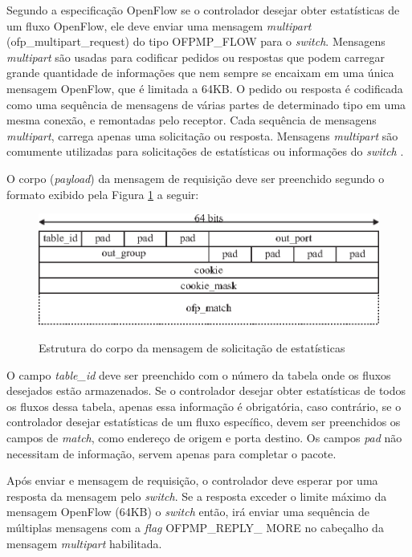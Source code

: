 Segundo a especificação OpenFlow \cite{OpenFlowSpec:2014} se o controlador desejar obter estatísticas de um fluxo OpenFlow, ele deve enviar uma mensagem \textit{multipart} (ofp\_multipart\_request) do tipo OFPMP\_FLOW para o \textit{switch}. Mensagens \textit{multipart} são usadas para codificar pedidos ou respostas que podem carregar grande quantidade de informações que nem sempre se encaixam em uma única mensagem OpenFlow, que é limitada a 64KB. O pedido ou resposta é codificada como uma sequência de mensagens de várias partes de determinado tipo em uma mesma conexão, e remontadas pelo receptor. Cada sequência de mensagens \textit{multipart}, carrega apenas uma solicitação ou resposta. Mensagens \textit{multipart} são comumente utilizadas para solicitações de estatísticas ou informações do \textit{switch} \cite{OpenFlowSpec:2014}.

O corpo (\textit{payload}) da mensagem de requisição deve ser preenchido segundo o formato exibido pela Figura \ref{fig:ofp-multipart-request} a seguir:

\begin{figure}[H]
  \centering
  \caption{Estrutura do corpo da mensagem de solicitação de estatísticas}
  \includegraphics[width=.80\textwidth]{images/ofp-flow-stats-request.eps}
  \label{fig:ofp-multipart-request}
\end{figure}

O campo \textit{table\_id} deve ser preenchido com o número da tabela onde os fluxos desejados estão armazenados. Se o controlador desejar obter estatísticas de todos os fluxos dessa tabela, apenas essa informação é obrigatória, caso contrário, se o controlador desejar estatísticas de um fluxo específico, devem ser preenchidos os campos de \textit{match}, como endereço de origem e porta destino. Os campos \textit{pad} não necessitam de informação, servem apenas para completar o pacote.

Após enviar e mensagem de requisição, o controlador deve esperar por uma resposta da mensagem pelo \textit{switch}. Se a resposta exceder o limite máximo da mensagem OpenFlow (64KB) o \textit{switch} então, irá enviar uma sequência de múltiplas mensagens com a \textit{flag} OFPMP\_REPLY\_ MORE no cabeçalho da mensagem \textit{multipart} habilitada. 

